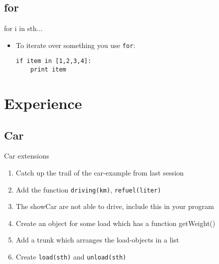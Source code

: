 \documentclass[hyperref={pdfpagelabels=false}]{beamer}
\newcommand{\code}[1]{\colorbox{lGray}{\texttt{#1}}}
\begin{document}
    \subsection{for}
        \begin{frame}[fragile]{for i in sth...}
        	\begin{itemize}
                \item<1-> To iterate over something you use \code{for}:
                    \begin{lstlisting}
if item in [1,2,3,4]:
    print item
\end{lstlisting}
            \end{itemize}
		\end{frame}

\section{Experience} 
	\subsection{Car}
		\begin{frame}{Car extensions}
			\begin{enumerate}
				\item<1-> Catch up the trail of the car-example from last session
                \item<2-> Add the function \code{driving(km)}, \code{refuel(liter)}
                \item<2-> The showCar are not able to drive, include this in your program
                \item<3-> Create an object for some load which has a function getWeight()
                \item<4-> Add a trunk which arranges the load-objects in a list
                \item<5-> Create \code{load(sth)} and \code{unload(sth)}
            \end{enumerate}
		\end{frame}
\end{document}
